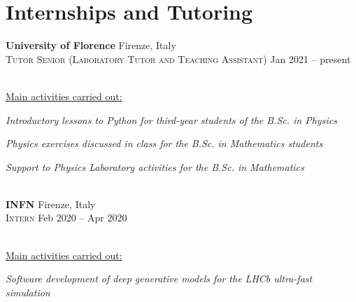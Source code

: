 \newcommand{\institution}[2]
  {\large \textbf{\color{hlcolor-0} #1} \hfill {\color{hlcolor-2} #2}}

\newcommand{\role}[2]
  {\small \color{hlcolor-1} 
  {\color{iconcolor} \faBriefcase}
  \textsc{#1} \hfill 
  {\color{iconcolor} \faClock}
  {#2}}


\section*{Internships and Tutoring}
\begin{cvcontent}
  \institution{University of Florence}{Firenze, Italy}\\ [0.5mm]
  \role{Tutor Senior (Laboratory Tutor and Teaching Assistant)}{Jan 2021 -- present}\\ [1.5mm]
  \\ [1.5mm]
  {\normalsize \color{maincolor} \ul{Main activities carried out:}\\ [1.5mm]
  \begin{itemize*}[label=\textcolor{iconcolor}{\textbullet}]
    \item \emph{Introductory lessons to Python for third-year 
      students of the B.Sc. in Physics}\\ [0.5mm]
    \item \emph{Physics exercises discussed in class for the 
      B.Sc. in Mathematics students}\\ [0.5mm]
    \item \emph{Support to Physics Laboratory activities for 
      the B.Sc. in Mathematics}
  \end{itemize*}}
  \\ [4mm]
  \institution{INFN}{Firenze, Italy}\\ [0.5mm]
  \role{Intern}{Feb 2020 -- Apr 2020}\\ [1.5mm]
  \\ [1.5mm]
  {\normalsize \color{maincolor} \ul{Main activities carried out:}\\ [1.5mm]
  \begin{itemize*}[label=\textcolor{iconcolor}{\textbullet}]
    \item \emph{Software development of deep generative models 
      for the LHCb ultra-fast simulation}\\ [0.5mm]

\end{itemize*}}
\end{cvcontent}
